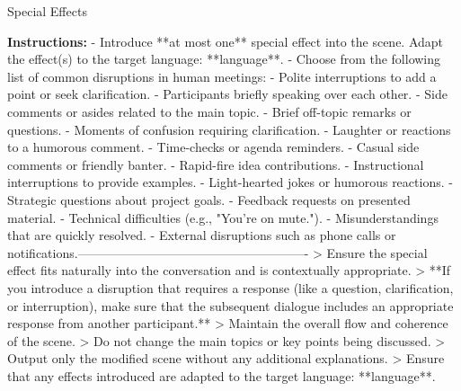 \begin{figure*}[t]
\begin{AIbox}{Special Effects}
{        \textbf{Instructions:} \newline
        - Introduce **at most one** special effect into the scene. Adapt the effect(s) to the target language: **{language}**. \newline
        - Choose from the following list of common disruptions in human meetings:\newline
        \quad - Polite interruptions to add a point or seek clarification.\newline  
        \quad - Participants briefly speaking over each other.\newline 
        \quad - Side comments or asides related to the main topic.\newline
        \quad - Brief off-topic remarks or questions.\newline
        \quad - Moments of confusion requiring clarification.\newline  
        \quad - Laughter or reactions to a humorous comment.\newline
        \quad - Time-checks or agenda reminders.\newline
        \quad - Casual side comments or friendly banter.\newline  
        \quad - Rapid-fire idea contributions.\newline
        \quad - Instructional interruptions to provide examples.\newline  
        \quad - Light-hearted jokes or humorous reactions.\newline
        \quad - Strategic questions about project goals.\newline
        \quad - Feedback requests on presented material.\newline
        \quad - Technical difficulties (e.g., "You're on mute.").\newline  
        \quad - Misunderstandings that are quickly resolved.\newline
        \quad - External disruptions such as phone calls or notifications.\newline -------------------------------------------------------\newline
        > Ensure the special effect fits naturally into the conversation and is contextually appropriate.\newline
        > **If you introduce a disruption that requires a response (like a question, clarification, or interruption), make sure that the subsequent dialogue includes an appropriate response from another participant.**\newline  
        > Maintain the overall flow and coherence of the scene.\newline
        > Do not change the main topics or key points being discussed. \newline 
        > Output only the modified scene without any additional explanations.\newline
        > Ensure that any effects introduced are adapted to the target language: **{language}**. \newline
        
}
\end{AIbox}
\end{figure*}
